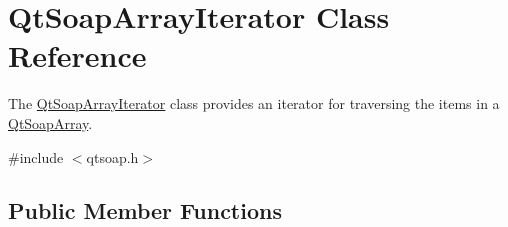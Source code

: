 \hypertarget{class_qt_soap_array_iterator}{}\section{Qt\+Soap\+Array\+Iterator Class Reference}
\label{class_qt_soap_array_iterator}


The \mbox{\hyperlink{class_qt_soap_array_iterator}{Qt\+Soap\+Array\+Iterator}} class provides an iterator for traversing the items in a \mbox{\hyperlink{class_qt_soap_array}{Qt\+Soap\+Array}}.  




{\ttfamily \#include $<$qtsoap.\+h$>$}

\subsection*{Public Member Functions}
